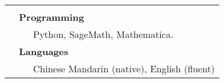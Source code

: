 \documentclass[letterpaper, 11pt, utf8, AutoFakeBold]{ctexart}
\newcommand{\mycolor}[0]{\color{RoyalBlue}}
\begin{document}
\begin{longtable}{p{1.5in}p{4.9in}}
& \\



{\mycolor{Skills}} 
& \textbf{Programming}\\
&\ \ \ Python, SageMath, Mathematica. \\
& \textbf{Languages} \\
&\ \ \ Chinese Mandarin (native), English (fluent) \\







\end{longtable}

\newpage

\vspace{0.4cm}\\
\hspace{2cm}{\huge 中文副本}



\vspace{0.5cm} 
\end{document}
